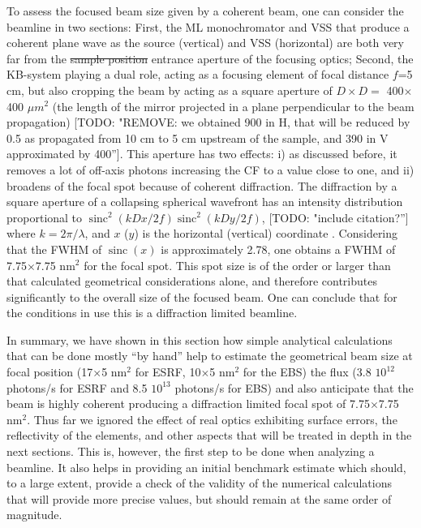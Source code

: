 \documentclass{iucr}              %
\newcommand{\todo}[1]{{\color{red}[TODO: "#1'']}}
\DeclareMathOperator{\sinc}{sinc}
\begin{document}
To assess the focused beam size given by a coherent beam, one can consider the beamline in two sections: First, the ML monochromator and VSS that produce a coherent plane wave as the source (vertical) and VSS (horizontal) are both very far from the {\color{green}\sout{sample position} entrance aperture of the focusing optics}; Second, the KB-system playing a dual role, acting as a focusing element of focal distance $f$=5 cm, but also cropping the beam by acting as a square aperture of $D \times D=$ 400$\times$400 $\mu m^2$ (the length of the mirror projected in a plane perpendicular to the beam propagation) 
\todo{REMOVE: we obtained 900 in H, that will be reduced by 0.5 as propagated from 10 cm to 5 cm upstream of the sample, and 390 in V approximated by 400}. This aperture has two effects: i) as discussed before, it removes a lot of off-axis photons increasing the CF to a value close to one, and ii) broadens of the focal spot because of coherent diffraction. The diffraction by a square aperture of a collapsing spherical wavefront has an intensity distribution proportional to $\sinc^2(k D x/2 f) \sinc^2(k D y / 2 f)$, \todo{include citation?} where $k=2\pi/\lambda$, and $x$ ($y$) is the horizontal (vertical) coordinate . Considering that the FWHM of $\sinc(x)$ is approximately 2.78, one obtains a FWHM of 7.75$\times$7.75 nm$^2$ for the focal spot. This spot size is of the order or larger than that calculated geometrical considerations alone, and therefore contributes significantly to the overall size of the focused beam. One can conclude that for the conditions in use this is a diffraction limited beamline. 


In summary, we have shown in this section how simple analytical calculations that can be done mostly ``by hand'' help to estimate the geometrical beam size at focal position (17$\times$5 nm$^2$ for ESRF, 10$\times$5 nm$^2$ for the EBS) the flux (3.8 $10^{12}$ photons/s for ESRF and 8.5 $10^{13}$ photons/s for EBS) and also anticipate that the beam is highly coherent producing a diffraction limited focal spot of  7.75$\times$7.75 nm$^2$. Thus far we ignored  the effect of real optics exhibiting surface errors, the reflectivity of the elements, and other aspects that will be treated in depth in the next sections. This is, however, the first step to be done when analyzing a beamline. It also helps in providing an initial benchmark estimate which should, to a large extent, provide a check of the validity of the numerical calculations that will provide more precise values, but should remain at the same order of magnitude.  
\end{document}
